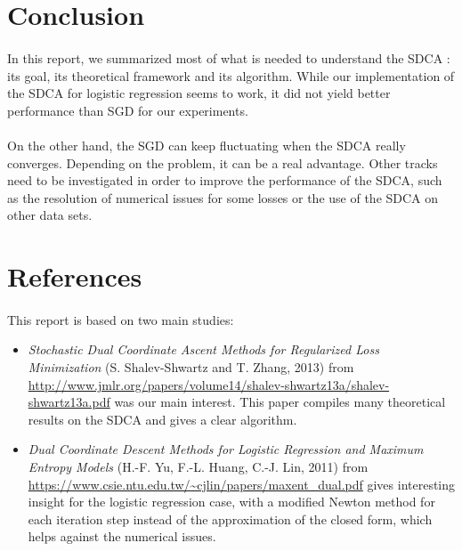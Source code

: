 \documentclass{article}
\begin{document}
\section*{Conclusion}

\paragraph{}In this report, we summarized most of what is needed to understand the SDCA : its goal, its theoretical framework and its algorithm.
While our implementation of the SDCA for logistic regression seems to work, it did not yield better performance than SGD for our experiments.

\paragraph{}On the other hand, the SGD can keep fluctuating when the SDCA really converges.
Depending on the problem, it can be a real advantage.
Other tracks need to be investigated in order to improve the performance of the SDCA, such as the resolution of numerical issues for some losses or the use of the SDCA on other data sets.



\section*{References}


\paragraph{}This report is based on two main studies:
\begin{itemize}
    \item \textit{Stochastic Dual Coordinate Ascent Methods for Regularized Loss Minimization} 
(S. Shalev-Shwartz and T. Zhang, 2013)
from \url{http://www.jmlr.org/papers/volume14/shalev-shwartz13a/shalev-shwartz13a.pdf}
was our main interest. This paper compiles many theoretical results on the SDCA and gives a clear algorithm.
    \item \textit{Dual Coordinate Descent Methods for Logistic Regression and Maximum Entropy Models} 
(H.-F. Yu, F.-L. Huang, C.-J. Lin, 2011) 
from \url{https://www.csie.ntu.edu.tw/~cjlin/papers/maxent_dual.pdf}
gives interesting insight for the logistic regression case, with a modified Newton method 
for each iteration step instead of the approximation of the closed form, which helps against 
the numerical issues.
\end{itemize}
\end{document}
